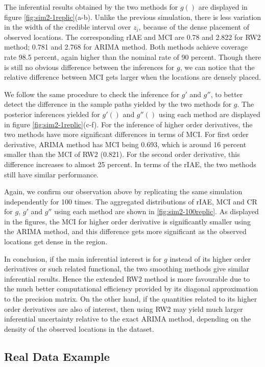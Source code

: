 \documentclass{article}
\begin{document}
The inferential results obtained by the two methods for $g()$ are displayed in figure \ref{fig:sim2-1replic}(a-b). Unlike the previous simulation, there is less variation in the width of the credible interval over $z_i$, because of the dense placement of observed locations. The corresponding rIAE and MCI are 0.78 and 2.822 for RW2 method; 0.781 and 2.768 for ARIMA method. Both methods achieve coverage rate 98.5 percent, again higher than the nominal rate of 90 percent. Though there is still no obvious difference between the inferences for $g$, we can notice that the relative difference between MCI gets larger when the locations are densely placed.

We follow the same procedure to check the inference for $g'$ and $g''$, to better detect the difference in the sample paths yielded by the two methods for $g$. The posterior inferences yielded for $g'()$ and $g''()$ using each method are displayed in figure \ref{fig:sim2-1replic}(c-f).
For the inference of higher order derivatives, the two methods have more significant differences in terms of MCI. For first order derivative, ARIMA method has MCI being 0.693, which is around 16 percent smaller than the MCI of RW2 (0.821). For the second order derivative, this difference increases to almost 25 percent. In terms of the rIAE, the two methods still have similar performance.

Again, we confirm our observation above by replicating the same simulation independently for 100 times. The aggregated distributions of rIAE, MCI and CR for $g$, $g'$ and $g''$ using each method are shown in \ref{fig:sim2-100replic}. As displayed in the figures, the MCI for higher order derivative is significantly smaller using the ARIMA method, and this difference gets more significant as the observed locations get dense in the region.

In conclusion, if the main inferential interest is for $g$ instead of its higher order derivatives or such related functional, the two smoothing methods give similar inferential results. Hence the extended RW2 method is more favourable due to the much better computational efficiency provided by its diagonal approximation to the precision matrix. On the other hand, if the quantities related to its higher order derivatives are also of interest, then using RW2 may yield much larger inferential uncertainty relative to the exact ARIMA method, depending on the density of the observed locations in the dataset. 



\subsection{Real Data Example}\label{co2}
\end{document}
